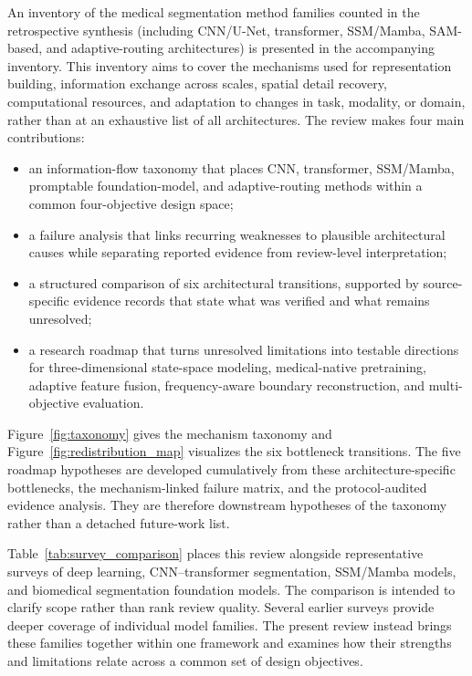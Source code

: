 \documentclass[5p,times,authoryear]{elsarticle}
\begin{document}
An inventory of the \CorpusTotal{} medical segmentation method families counted in the retrospective synthesis (including CNN/U-Net, transformer, SSM/Mamba, SAM-based, and adaptive-routing architectures) is presented in the accompanying inventory. This inventory aims to cover the mechanisms used for representation building, information exchange across scales, spatial detail recovery, computational resources, and adaptation to changes in task, modality, or domain, rather than at an exhaustive list of all architectures.
The review makes four main contributions:
\begin{itemize}
    \item an information-flow taxonomy that places CNN, transformer, SSM/Mamba, promptable foundation-model, and adaptive-routing methods within a common four-objective design space;
    \item a failure analysis that links recurring weaknesses to plausible architectural causes while separating reported evidence from review-level interpretation;
    \item a structured comparison of six architectural transitions, supported by source-specific evidence records that state what was verified and what remains unresolved;
    \item a research roadmap that turns unresolved limitations into testable directions for three-dimensional state-space modeling, medical-native pretraining, adaptive feature fusion, frequency-aware boundary reconstruction, and multi-objective evaluation.
\end{itemize}

Figure~\ref{fig:taxonomy} gives the mechanism taxonomy and Figure~\ref{fig:redistribution_map} visualizes the six bottleneck transitions. The five roadmap hypotheses are developed cumulatively from these architecture-specific bottlenecks, the mechanism-linked failure matrix, and the protocol-audited evidence analysis. They are therefore downstream hypotheses of the taxonomy rather than a detached future-work list.

Table~\ref{tab:survey_comparison} places this review alongside representative surveys of deep learning, CNN--transformer segmentation, SSM/Mamba models, and biomedical segmentation foundation models. The comparison is intended to clarify scope rather than rank review quality. Several earlier surveys provide deeper coverage of individual model families. The present review instead brings these families together within one framework and examines how their strengths and limitations relate across a common set of design objectives.
\end{document}
